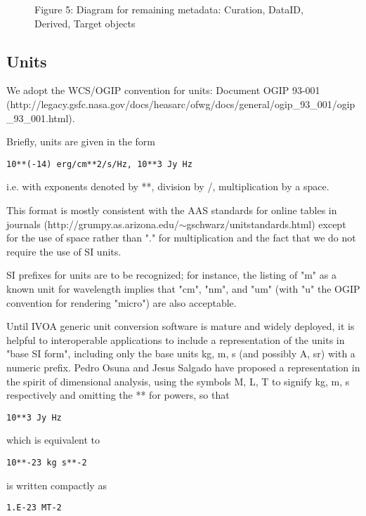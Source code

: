\documentclass[11pt]{article}
\begin{document}
\begin{figure}[h]

\colorbox{iblue}{
}
{
\colorbox{iblue}{
\begin{minipage}{6.0in}
Figure 5:  Diagram for remaining metadata:
Curation, DataID, Derived, Target objects 

\end{minipage}
}
}
\end{figure}





\clearpage

\subsection{Units}

We adopt the WCS/OGIP convention for units: 
Document OGIP 93-001 \\
(http://legacy.gsfc.nasa.gov/docs/heasarc/ofwg/docs/general/ogip\_93\_001/ogip\_93\_001.html).

Briefly, units are given in the form
\begin{verbatim}
10**(-14) erg/cm**2/s/Hz, 10**3 Jy Hz
\end{verbatim}

i.e. with exponents denoted by **, division by /, multiplication by a space.

This format is mostly consistent with the 
AAS standards for online tables in journals
(http://grumpy.as.arizona.edu/$\sim$gschwarz/unitstandards.html)
except for the use of space rather than "." for multiplication and the 
fact that we do not require the use of SI units.

SI prefixes for units are to be recognized; for instance, the listing of
"m" as a known unit for wavelength implies that "cm", "nm", and "um" (with
"u" the OGIP convention for rendering "micro") are also acceptable.

Until IVOA generic unit conversion software is mature and widely deployed, 
it is helpful to interoperable applications to include a representation
of the units in "base SI form", including only the base units kg, m, s (and
possibly A, sr) with a numeric prefix. Pedro Osuna and Jesus Salgado have proposed
a representation in the spirit of dimensional analysis, using the symbols
M, L, T to signify kg, m, s respectively and omitting the ** for powers, so
that 
\begin{verbatim}
10**3 Jy Hz
\end{verbatim}
which is equivalent to
\begin{verbatim}
10**-23 kg s**-2
\end{verbatim}
is written compactly as
\begin{verbatim}
1.E-23 MT-2
\end{verbatim}
\end{document}

